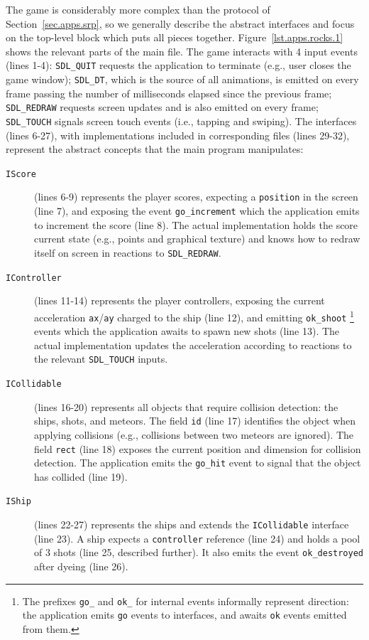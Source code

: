 \documentclass[preprint]{sigplanconf}
\newcommand{\code}[1] {{\small{\texttt{#1}}}}
\newcommand{\1}{\;}
\newcommand{\2}{\;\;}
\newcommand{\3}{\;\;\;}
\newcommand{\5}{\;\;\;\;\;}
\begin{document}
The game is considerably more complex than the protocol of 
Section~\ref{sec.apps.srp}, so we generally describe the abstract interfaces 
and focus on the top-level block which puts all pieces together.
%
Figure~\ref{lst.apps.rocks.1} shows the relevant parts of the main file.
%
The game interacts with 4 input events (lines 1-4):
\code{SDL\_QUIT} requests the application to terminate (e.g., user closes the 
game window);
\code{SDL\_DT}, which is the source of all animations, is emitted on every 
frame passing the number of milliseconds elapsed since the previous frame;
\code{SDL\_REDRAW} requests screen updates and is also emitted on every frame;
\code{SDL\_TOUCH} signals screen touch events (i.e., tapping and swiping).
%
The interfaces (lines 6-27), with implementations included in corresponding 
files (lines 29-32), represent the abstract concepts that the main program 
manipulates:
\begin{description}
\item[\code{IScore}] (lines 6-9) represents the player scores, expecting a 
\code{position} in the screen (line 7), and exposing the event 
\code{go\_increment} which the application emits to increment the score (line 
8).
The actual implementation holds the score current state (e.g., points and 
graphical texture) and knows how to redraw itself on screen in reactions to 
\code{SDL\_REDRAW}.
\item[\code{IController}] (lines 11-14) represents the player controllers, 
exposing the current acceleration \code{ax}/\code{ay} charged to the ship (line 
12), and emitting \code{ok\_shoot}%
\footnote {
The prefixes \code{go\_} and \code{ok\_} for internal events informally 
represent direction: the application emits \code{go} events to interfaces, and 
awaits \code{ok} events emitted from them.
}
events which the application awaits to spawn new shots (line 13).
The actual implementation updates the acceleration according to reactions to 
the relevant \code{SDL\_TOUCH} inputs.
\item[\code{ICollidable}] (lines 16-20) represents all objects that require 
collision detection: the ships, shots, and meteors.
The field \code{id} (line 17) identifies the object when applying collisions 
(e.g., collisions between two meteors are ignored).
The field \code{rect} (line 18) exposes the current position and dimension for 
collision detection.
The application emits the \code{go\_hit} event to signal that the object has 
collided (line 19).
\item[\code{IShip}] (lines 22-27) represents the ships and extends the 
\code{ICollidable} interface (line 23).
A ship expects a \code{controller} reference (line 24) and holds a pool of 3 
shots (line 25, described further).
It also emits the event \code{ok\_destroyed} after dyeing (line 26).
\end{description}
\end{document}
